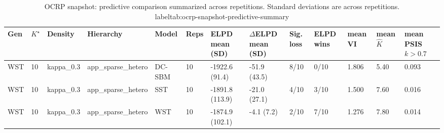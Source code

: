 \begin{table}[!h]
\centering
\caption{OCRP snapshot: predictive comparison summarized across repetitions. Standard deviations are across repetitions.\\label{tab:ocrp-snapshot-predictive-summary}}
\centering
\begin{tabular}[t]{lllllllllllll}
\toprule
Gen & $K^\star$ & Density & Hierarchy & Model & Reps & ELPD mean (SD) & $\Delta$ELPD mean (SD) & Sig. loss & ELPD wins & mean VI & mean $\hat K$ & mean PSIS $k>0.7$\\
\midrule
WST & 10 & kappa_0.3 & app_sparse_hetero & DC-SBM & 10 & -1922.6 (91.4) & -51.9 (43.5) & 8/10 & 0/10 & 1.806 & 5.40 & 0.093\\
WST & 10 & kappa_0.3 & app_sparse_hetero & SST & 10 & -1891.8 (113.9) & -21.0 (27.1) & 4/10 & 3/10 & 1.500 & 7.60 & 0.016\\
WST & 10 & kappa_0.3 & app_sparse_hetero & WST & 10 & -1874.9 (102.1) & -4.1 (7.2) & 2/10 & 7/10 & 1.276 & 7.80 & 0.014\\
\bottomrule
\end{tabular}
\end{table}
